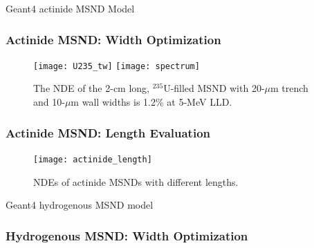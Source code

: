 \documentclass[fleqn]{beamer}
\begin{document}
 
 
 \begin{frame}
 \centering
  Geant4 actinide MSND Model
 \end{frame}


 
 \begin{frame}
  \frametitle{Actinide MSND: Width Optimization}
  \begin{figure}
\centering
\texttt{[image: U235\_tw]}
\texttt{[image: spectrum]}
\caption{The NDE of the 2-cm long, $^{235}$U-filled MSND with 20-$\mu$m trench and 10-$\mu$m wall widths is 1.2\% at 5-MeV LLD.}
\end{figure}
 \end{frame}
 
 \begin{frame}
  \frametitle{Actinide MSND: Length Evaluation}
  \begin{figure}[h!tb]
\centering
\texttt{[image: actinide\_length]}
\caption{NDEs of actinide MSNDs with different lengths.}
\label{actinide_length}
\end{figure}
 \end{frame}
 
 \begin{frame}
 \centering
  Geant4 hydrogenous MSND model
 \end{frame}

 
 \begin{frame}
  \frametitle{Hydrogenous MSND: Width Optimization}
  \begin{table}[h!tb]
\caption{NDEs (\%) of the 2-cm long hydrogenous MSNDs with different trench and wall widths. Shown in parentheses are LLDs in MeV that achieve S/N ratio of 100.}
\label{tw_hmsnd_gamma}
\end{table}
 \end{frame}
 
\end{document}
